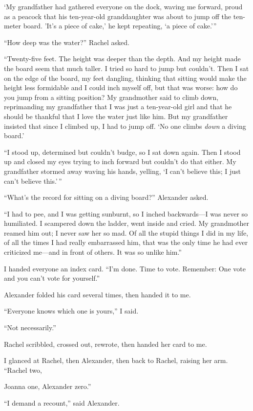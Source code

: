 `My grandfather had gathered everyone on the dock, waving me forward,
proud as a peacock that his ten-year-old granddaughter was about to jump
off the ten-meter board. 'It's a piece of cake,' he kept repeating, `a
piece of cake.'''

``How deep was the water?'' Rachel asked.

``Twenty-five feet. The height was deeper than the depth. And my height
made the board seem that much taller. I tried so hard to jump but
couldn't. Then I sat on the edge of the board, my feet dangling,
thinking that sitting would make the height less formidable and I could
inch myself off, but that was worse: how do you jump from a sitting
position? My grandmother said to climb down, reprimanding my grandfather
that I was just a ten-year-old girl and that he should be thankful that
I love the water just like him. But my grandfather insisted that since I
climbed up, I had to jump off. `No one climbs \emph{down} a diving
board.'

``I stood up, determined but couldn't budge, so I sat down again. Then I
stood up and closed my eyes trying to inch forward but couldn't do that
either. My grandfather stormed away waving his hands, yelling, `I can't
believe this; I just can't believe this.'\,''

``What's the record for sitting on a diving board?'' Alexander asked.

``I had to pee, and I was getting sunburnt, so I inched backwards---I
was never so humiliated. I scampered down the ladder, went inside and
cried. My grandmother reamed him out; I never saw her so mad. Of all the
stupid things I did in my life, of all the times I had really
embarrassed him, that was the only time he had ever criticized me---and
in front of others. It was so unlike him.''

I handed everyone an index card. ``I'm done. Time to vote. Remember: One
vote and you can't vote for yourself.''

Alexander folded his card several times, then handed it to me.

``Everyone knows which one is yours,'' I said.

``Not necessarily.''

Rachel scribbled, crossed out, rewrote, then handed her card to me.

I glanced at Rachel, then Alexander, then back to Rachel, raising her
arm. ``Rachel two,

Joanna one, Alexander zero.''

``I demand a recount,'' said Alexander.

